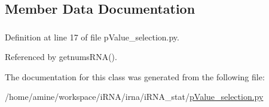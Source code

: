 \subsection{\-Member \-Data \-Documentation}
\hypertarget{classirna_1_1iRNA__stat_1_1pValue__selection_1_1pValue__selection_a1b9fdf8e26b6da07b4df1b7829daef79}{
\subsubsection[{p\-Value\-\_\-thres}]{}}
\label{classirna_1_1iRNA__stat_1_1pValue__selection_1_1pValue__selection_a1b9fdf8e26b6da07b4df1b7829daef79}


\-Definition at line 17 of file p\-Value\-\_\-selection.\-py.



\-Referenced by getnums\-R\-N\-A().



\-The documentation for this class was generated from the following file\-:\begin{DoxyCompactItemize}
\item 
/home/amine/workspace/i\-R\-N\-A/irna/i\-R\-N\-A\-\_\-stat/\hyperlink{pValue__selection_8py}{p\-Value\-\_\-selection.\-py}\end{DoxyCompactItemize}
